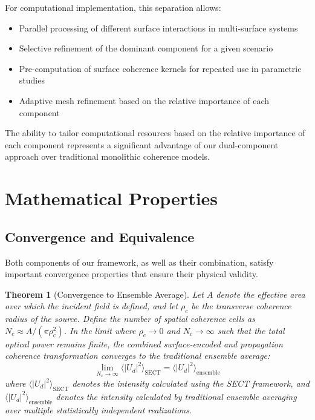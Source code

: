 \documentclass[a4paper,12pt]{article}
\newtheorem{theorem}{Theorem}[section]
\begin{document}
For computational implementation, this separation allows:

\begin{itemize}
\item Parallel processing of different surface interactions in multi-surface systems
\item Selective refinement of the dominant component for a given scenario
\item Pre-computation of surface coherence kernels for repeated use in parametric studies
\item Adaptive mesh refinement based on the relative importance of each component
\end{itemize}

The ability to tailor computational resources based on the relative importance of each component represents a significant advantage of our dual-component approach over traditional monolithic coherence models.


\section{Mathematical Properties} \label{sec:mathematical_properties}

\subsection{Convergence and Equivalence}

Both components of our framework, as well as their combination, satisfy important convergence properties that ensure their physical validity.

\begin{theorem}[Convergence to Ensemble Average] \label{thm:convergence}
Let $A$ denote the effective area over which the incident field is defined, and let $\rho_c$ be the transverse coherence radius of the source. Define the number of spatial coherence cells as $N_c \approx A / (\pi \rho_c^2)$. In the limit where $\rho_c \to 0$ and $N_c \to \infty$ such that the total optical power remains finite, the combined surface-encoded and propagation coherence transformation converges to the traditional ensemble average:
\begin{equation}
\lim_{N_c \to \infty} \langle |U_d|^2 \rangle_{\text{SECT}} = \langle |U_d|^2 \rangle_{\text{ensemble}}
\end{equation}
where $\langle |U_d|^2 \rangle_{\text{SECT}}$ denotes the intensity calculated using the SECT framework, and $\langle |U_d|^2 \rangle_{\text{ensemble}}$ denotes the intensity calculated by traditional ensemble averaging over multiple statistically independent realizations.
\end{theorem}
\end{document}
